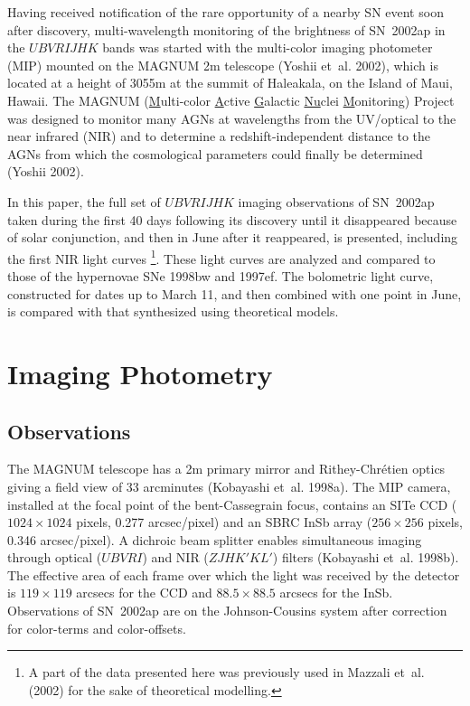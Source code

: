 \documentclass[10pt,preprint2]{aastex}
\begin{document}
Having received notification of the rare opportunity of a nearby
SN event soon after discovery, multi-wavelength monitoring of the
brightness of SN~2002ap in the $UBVRIJHK$ bands was started with
the multi-color imaging photometer (MIP) mounted on the MAGNUM
2m telescope (Yoshii et~al. 2002), which is located at a
height of 3055m at the summit of Haleakala, on the Island of Maui,
Hawaii. The MAGNUM (\underline{M}ulti-color \underline{A}ctive
\underline{G}alactic \underline{Nu}clei \underline{M}onitoring)
Project was designed to monitor many AGNs at wavelengths from
the UV/optical to the near infrared (NIR) and to determine a
redshift-independent distance to the AGNs from which the
cosmological parameters could finally be determined (Yoshii 2002).

In this paper, the full set of $UBVRIJHK$ imaging observations
of SN~2002ap taken during the first 40 days following its discovery
until it disappeared because of solar conjunction,
and then in June after it reappeared, is presented, including the first NIR
light curves
\footnote{A part of the data presented here was previously used
in Mazzali et~al. (2002) for the sake of theoretical modelling.}.
These light curves are analyzed and compared to those of the
hypernovae SNe 1998bw and 1997ef.
The bolometric light curve, constructed for
dates up to March 11, and then combined with one point in June,
is compared with that synthesized using theoretical models.


\section{Imaging Photometry}

\subsection{Observations}

The MAGNUM telescope has a 2m primary mirror and Rithey-Chr\'etien
optics giving a field view of 33 arcminutes (Kobayashi et~al. 1998a).
The MIP camera, installed at the focal point of the bent-Cassegrain
focus, contains an SITe CCD ($1024\times 1024$ pixels, 0.277 arcsec/pixel)
and an SBRC InSb array ($256\times 256$ pixels, 0.346 arcsec/pixel).
A dichroic beam splitter enables simultaneous imaging through optical
($UBVRI$) and NIR ($ZJHK'KL'$) filters (Kobayashi et~al. 1998b).
The effective area of each frame over which the light was received
by the detector is $119\times 119$ arcsecs for the CCD and
$88.5\times 88.5$ arcsecs for the InSb.  Observations of SN~2002ap
are on the Johnson-Cousins system after correction for color-terms
and color-offsets.
\end{document}

